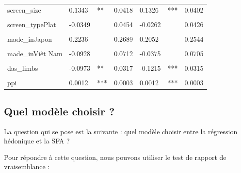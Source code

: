 \documentclass[
  12pt,
]{report}
\begin{document}
\begin{table}[!h]
\begin{tabular}[t]{lllllll}
screen\_size & 0.1343 & ** & 0.0418 & 0.1326 & *** & 0.0402\\
\cellcolor{gray!6}{screen\_typeBords incurvés} & \cellcolor{gray!6}{-0.1086} & \cellcolor{gray!6}{} & \cellcolor{gray!6}{0.1109} & \cellcolor{gray!6}{-0.0897} & \cellcolor{gray!6}{} & \cellcolor{gray!6}{0.1076}\\
screen\_typePlat & -0.0349 &  & 0.0454 & -0.0262 &  & 0.0426\\
\cellcolor{gray!6}{screen\_typePliable} & \cellcolor{gray!6}{0.3733} & \cellcolor{gray!6}{***} & \cellcolor{gray!6}{0.0738} & \cellcolor{gray!6}{0.3778} & \cellcolor{gray!6}{***} & \cellcolor{gray!6}{0.0702}\\
\addlinespace
made\_inJapon & 0.2236 &  & 0.2689 & 0.2052 &  & 0.2544\\
\cellcolor{gray!6}{made\_inThaïlande} & \cellcolor{gray!6}{0.6981} & \cellcolor{gray!6}{***} & \cellcolor{gray!6}{0.1551} & \cellcolor{gray!6}{0.6992} & \cellcolor{gray!6}{***} & \cellcolor{gray!6}{0.1472}\\
made\_inViêt Nam & -0.0928 &  & 0.0712 & -0.0375 &  & 0.0705\\
\cellcolor{gray!6}{upgrade\_storageTRUE} & \cellcolor{gray!6}{-0.2819} & \cellcolor{gray!6}{***} & \cellcolor{gray!6}{0.0472} & \cellcolor{gray!6}{-0.2619} & \cellcolor{gray!6}{***} & \cellcolor{gray!6}{0.0455}\\
das\_limbs & -0.0973 & ** & 0.0317 & -0.1215 & *** & 0.0315\\
\addlinespace
\cellcolor{gray!6}{network5G} & \cellcolor{gray!6}{0.1973} & \cellcolor{gray!6}{***} & \cellcolor{gray!6}{0.0398} & \cellcolor{gray!6}{0.2022} & \cellcolor{gray!6}{***} & \cellcolor{gray!6}{0.0382}\\
ppi & 0.0012 & *** & 0.0003 & 0.0012 & *** & 0.0003\\
\bottomrule
\end{tabular}
\end{table}

\newpage

\subsection{Quel modèle choisir ?}\label{quel-moduxe8le-choisir}

La question qui se pose est la suivante : quel modèle choisir entre la
régression hédonique et la SFA ?

Pour répondre à cette question, nous pouvons utiliser le test de rapport
de vraisemblance :
\end{document}
